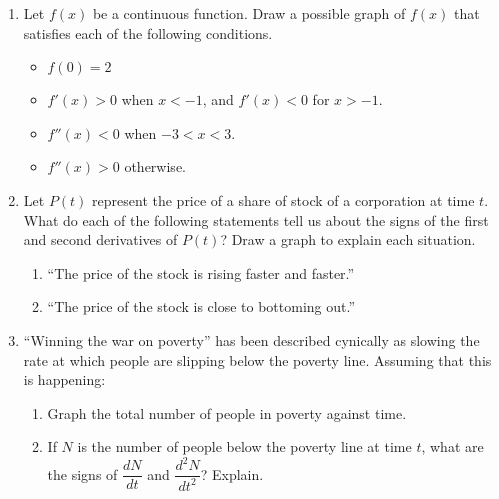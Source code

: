 \documentclass[11pt]{article}
\begin{document}
\begin{enumerate}
\item Let $f(x)$ be a continuous function.  Draw a possible graph of
  $f(x)$ that satisfies each of the following conditions.
 	\begin{itemize}
 	\item $f(0)=2$
 	\item $f'(x)> 0$ when $x<-1$, and $f'(x)< 0$ for $x>-1$.
 	\item $f''(x)<0$ when $-3 < x < 3$.
 	\item $f''(x)>0$ otherwise.
 	\end{itemize}
  \begin{center}
  \end{center}

  \newpage

\item Let $P(t)$ represent the price of a share of stock of a
  corporation at time $t$. What do each of the following statements
  tell us about the signs of the first and second derivatives of
  $P(t)$? Draw a graph to explain each situation.
  \begin{enumerate}
  \item ``The price of the stock is rising faster and faster.''
    \vfill
  \item ``The price of the stock is close to bottoming out.''
    \vfill
  \end{enumerate}

\newpage

\item ``Winning the war on poverty'' has been described cynically as
  slowing the rate at which people are slipping below the poverty
  line. Assuming that this is happening:
  \begin{enumerate}
  \item Graph the total number of people in poverty against time.
    \vfill
  \item If $N$ is the number of people below the poverty line at time
    $t$, what are the signs of $\dfrac{dN}{dt}$ and
    $\dfrac{d^2N}{dt^2}$? Explain.
    \vfill
  \end{enumerate}


\end{enumerate}
\end{document}
